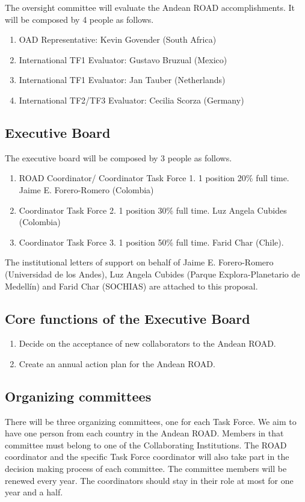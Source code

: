 \documentclass[12pt]{article}
\begin{document}
The oversight committee will evaluate the Andean ROAD
accomplishments. It will be composed by 4 people as follows.
\begin{enumerate}
\item OAD Representative: Kevin Govender (South Africa)
\item International TF1 Evaluator: Gustavo Bruzual (Mexico)
\item International TF1 Evaluator: Jan Tauber (Netherlands)
\item International TF2/TF3 Evaluator: Cecilia Scorza (Germany)
\end{enumerate}
\subsection*{Executive Board}
\noindent
The executive board will be composed by 3 people as follows.
\begin{enumerate}
\item ROAD Coordinator/ Coordinator Task Force 1. 1 position 20\% full
  time. Jaime E. Forero-Romero (Colombia) 
\item Coordinator Task Force 2. 1 position 30\% full time. Luz Angela
  Cubides (Colombia) 
\item Coordinator Task Force 3. 1 position 50\% full time. Farid Char
  (Chile). 
\end{enumerate}

\noindent
The institutional letters of support on behalf of Jaime
E. Forero-Romero (Universidad de los Andes), Luz Angela Cubides
(Parque Explora-Planetario de Medell\'in) and Farid Char (SOCHIAS) are
attached to this proposal. 


\subsection*{Core functions of the Executive Board}

\begin{enumerate}
\item Decide on the acceptance of new collaborators to the Andean ROAD.
\item Create an annual action plan for the Andean ROAD.
\end{enumerate}


\subsection*{Organizing committees}

There will be three organizing committees, one for each Task
Force. We aim to have one person from each country in the
Andean ROAD. Members in that committee must belong to one of the
Collaborating Institutions. The ROAD coordinator and the specific Task
Force coordinator will also take part in the decision making process of each
committee. The committee members will be renewed every year. The
coordinators should stay in their role at most for one year and a
half. 
\end{document}
